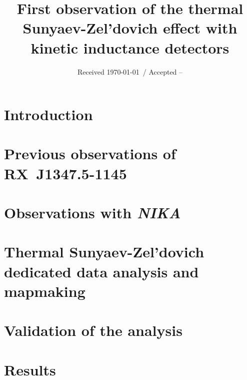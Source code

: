 \documentclass[twocolumn,structabstract]{aa}
\begin{document}
\title{First observation of the thermal Sunyaev-Zel'dovich effect with kinetic inductance detectors}

\date{Received \today \ / Accepted --}

\maketitle
\section{Introduction}
\label{sec:introduction}

\section{Previous observations of RX~J1347.5-1145}
\label{sec:previous_obs}

\section{Observations with {\itshape \bfseries NIKA}}
\label{sec:observations}

\section{Thermal Sunyaev-Zel'dovich dedicated data analysis and mapmaking}
\label{sec:SZ_analysis}

\section{Validation of the analysis}
\label{sec:simu_and_idcs}

\section{Results}
\label{sec:results}

\end{document}
